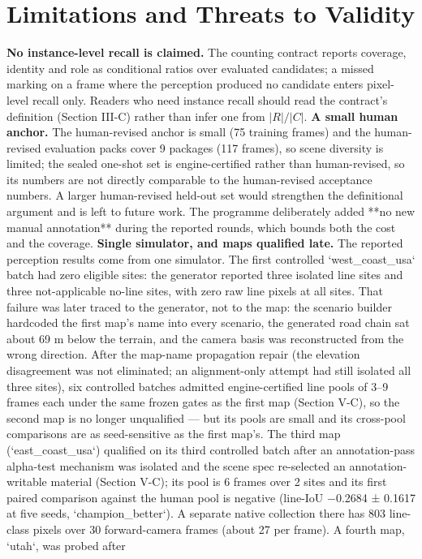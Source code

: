 \documentclass[journal]{IEEEtran}
\begin{document}
\section{Limitations and Threats to Validity}
\textbf{No instance-level recall is claimed.} The counting contract reports coverage, identity and role as
conditional ratios over evaluated candidates; a missed marking on a frame where the perception produced no
candidate enters pixel-level recall only. Readers who need instance recall should read the contract's
definition (Section III-C) rather than infer one from $|R|/|C|$.
\textbf{A small human anchor.} The human-revised anchor is small (75 training frames) and the human-revised evaluation packs
cover 9 packages (117 frames), so scene diversity is limited; the sealed one-shot set is engine-certified rather than
human-revised, so its numbers are not directly comparable to the human-revised acceptance numbers. A larger human-revised
held-out set would strengthen the definitional argument and is left to future work. The programme deliberately added **no
new manual annotation** during the reported rounds, which bounds both the cost and the coverage.
\textbf{Single simulator, and maps qualified late.} The reported perception
results come from one simulator. The first controlled `west_coast_usa` batch had zero eligible
sites: the generator reported three isolated line sites and three not-applicable no-line sites,
with zero raw line pixels at all sites. That failure was later traced to the generator, not to the
map: the scenario builder hardcoded the first map's name into every scenario, the generated road
chain sat about 69 m below the terrain, and the camera basis was reconstructed from the wrong
direction. After the map-name propagation repair (the elevation disagreement was not eliminated;
an alignment-only attempt had still isolated all three sites), six controlled batches admitted engine-certified line pools
of 3--9 frames each under the same frozen gates as the first map (Section V-C), so the second map
is no longer unqualified --- but its pools are small and its cross-pool comparisons are as
seed-sensitive as the first map's. The third map (`east_coast_usa`) qualified on its third
controlled batch after an annotation-pass alpha-test mechanism was isolated and the scene spec
re-selected an annotation-writable material (Section V-C); its pool is 6 frames over 2 sites and
its first paired comparison against the human pool is negative (line-IoU −0.2684 ± 0.1617 at five
seeds, `champion_better`). A separate native collection there has 803 line-class
pixels over 30 forward-camera frames (about 27 per frame). A fourth map, `utah`, was probed after
\end{document}
